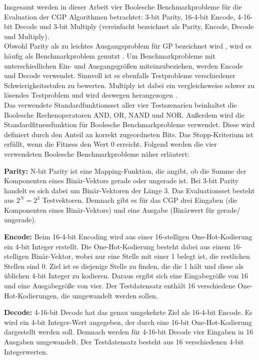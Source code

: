 Insgesamt werden in dieser Arbeit vier Boolesche Benchmarkprobleme für die Evaluation der CGP Algorithmen betrachtet: 3-bit Parity, 16-4-bit Encode, 4-16-bit Decode und 3-bit Multiply (vereinfacht bezeichnet als Parity, Encode, Decode und Multiply).\\
Obwohl Parity als zu leichtes Ausgangsproblem für GP bezeichnet wird \cite{white_better_2013}, wird es häufig als Benchmarkproblem genutzt \cite{yu_neutrality_2001, kaufmann_kalkreuth_2017, kaufmann_kalkreuth_2020}.
Um Benchmarkprobleme mit unterschiedlichen Ein- und Ausgangsgrößen miteinzubeziehen, werden Encode und Decode verwendet.
Sinnvoll ist es ebenfalls Testprobleme verschiedener Schwierigkeitsstufen zu bewerten.
Multiply ist dabei ein vergleichsweise schwer zu lösendes Testproblem und wird deswegen herangezogen \cite{walker_2008}.\\

Das verwendete Standardfunktionsset aller vier Testszenarien beinhaltet die Boolesche Rechenoperatoren AND, OR, NAND und NOR.
Außerdem wird die Standardfitnessfunktion für Boolesche Benchmarkprobleme verwendet.
Diese wird definiert durch den Anteil an korrekt zugeordneten Bits. \cite{cui_equidistant_2023}
Das Stopp-Kriterium ist erfüllt, wenn die Fitness den Wert 0 erreicht.
Folgend werden die vier verwendeten Boolesche Benchmarkprobleme näher erläutert:

\textbf{Parity:} N-bit Parity ist eine Mapping-Funktion, die angibt, ob die Summe der Komponenten eines Binär-Vektors gerade oder ungerade ist.
Bei 3-bit Parity handelt es sich dabei um Binär-Vektoren der Länge 3.
Das Evaluationsset besteht aus $2^N=2^3$ Testvektoren. \cite{hohil_1999}
Demnach gibt es für das CGP drei Eingaben (die Komponenten eines Binär-Vektors) und eine Ausgabe (Binärwert für \glqq gerade\grqq\space / \glqq ungerade\grqq).

\textbf{Encode:} Beim 16-4-bit Encoding wird aus einer 16-stelligen One-Hot-Kodierung ein 4-bit Integer erstellt.
Die One-Hot-Kodierung besteht dabei aus einem 16-stelligen Binär-Vektor, wobei nur eine Stelle mit einer 1 belegt ist, die restlichen Stellen sind 0.
Ziel ist es diejenige Stelle zu finden, die die 1 hält und diese als üblichen 4-bit Integer zu kodieren. \cite{cui_weighted_mutation, goldman_2015}
Daraus ergibt sich eine Eingabegröße von 16 und eine Ausgabegröße von vier.
Der Testdatensatz enthält 16 verschiedene One-Hot-Kodierungen, die umgewandelt werden sollen.

\textbf{Decode:} 4-16-bit Decode hat das genau umgekehrte Ziel als 16-4-bit Encode.
Es wird ein 4-bit Integer-Wert angegeben, der durch eine 16-bit One-Hot-Kodierung dargestellt werden soll. \cite{cui_weighted_mutation}
Demnach werden für 4-16-bit Decode vier Eingaben in 16 Ausgaben umgewandelt.
Der Testdatensatz besteht aus 16 verschiedenen 4-bit Integerwerten.


